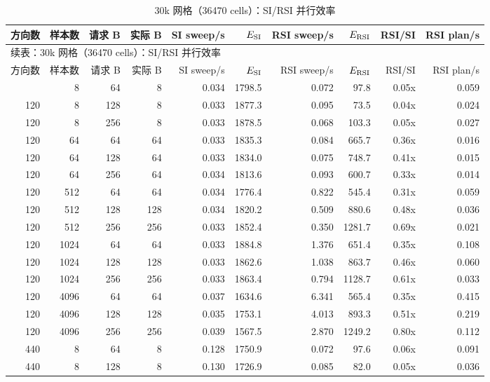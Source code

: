 {\tiny\setlength{\tabcolsep}{2.3pt}
\begin{longtable}{rrrrrrrrrr}
\caption{30k 网格（36470 cells）：SI/RSI 并行效率}\label{tab:factor-efficiency-30k}\\
\toprule
方向数 & 样本数 & 请求 B & 实际 B & SI sweep/s & $E_{\rm SI}$ & RSI sweep/s & $E_{\rm RSI}$ & RSI/SI & RSI plan/s\\
\midrule
\endfirsthead
\multicolumn{10}{l}{\small 续表：30k 网格（36470 cells）：SI/RSI 并行效率}\\
\toprule
方向数 & 样本数 & 请求 B & 实际 B & SI sweep/s & $E_{\rm SI}$ & RSI sweep/s & $E_{\rm RSI}$ & RSI/SI & RSI plan/s\\
\midrule
\endhead
\bottomrule
\endfoot
120 & 8 & 64 & 8 & 0.034 & 1798.5 & 0.072 & 97.8 & 0.05x & 0.059\\
120 & 8 & 128 & 8 & 0.033 & 1877.3 & 0.095 & 73.5 & 0.04x & 0.024\\
120 & 8 & 256 & 8 & 0.033 & 1878.5 & 0.068 & 103.3 & 0.05x & 0.027\\
120 & 64 & 64 & 64 & 0.033 & 1835.3 & 0.084 & 665.7 & 0.36x & 0.016\\
120 & 64 & 128 & 64 & 0.033 & 1834.0 & 0.075 & 748.7 & 0.41x & 0.015\\
120 & 64 & 256 & 64 & 0.034 & 1813.6 & 0.093 & 600.7 & 0.33x & 0.014\\
120 & 512 & 64 & 64 & 0.034 & 1776.4 & 0.822 & 545.4 & 0.31x & 0.059\\
120 & 512 & 128 & 128 & 0.034 & 1820.2 & 0.509 & 880.6 & 0.48x & 0.036\\
120 & 512 & 256 & 256 & 0.033 & 1852.4 & 0.350 & 1281.7 & 0.69x & 0.021\\
120 & 1024 & 64 & 64 & 0.033 & 1884.8 & 1.376 & 651.4 & 0.35x & 0.108\\
120 & 1024 & 128 & 128 & 0.033 & 1862.6 & 1.038 & 863.7 & 0.46x & 0.060\\
120 & 1024 & 256 & 256 & 0.033 & 1863.4 & 0.794 & 1128.7 & 0.61x & 0.033\\
120 & 4096 & 64 & 64 & 0.037 & 1634.6 & 6.341 & 565.4 & 0.35x & 0.415\\
120 & 4096 & 128 & 128 & 0.035 & 1753.1 & 4.013 & 893.3 & 0.51x & 0.219\\
120 & 4096 & 256 & 256 & 0.039 & 1567.5 & 2.870 & 1249.2 & 0.80x & 0.112\\
440 & 8 & 64 & 8 & 0.128 & 1750.9 & 0.072 & 97.6 & 0.06x & 0.091\\
440 & 8 & 128 & 8 & 0.130 & 1726.9 & 0.085 & 82.0 & 0.05x & 0.036\\

\end{longtable}}
